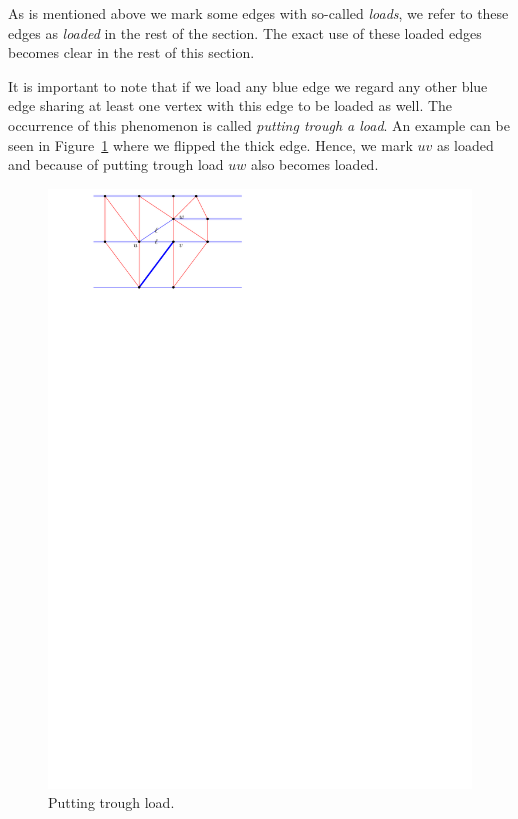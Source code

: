   As is mentioned above we mark some edges with so-called \emph{loads}, we refer to these edges as \emph{loaded} in the rest of the section.
  The exact use of these loaded edges becomes clear in the rest of this section.

  It is important to note that if we load any blue edge we regard any other blue edge sharing at least one vertex with this edge to be loaded as well.
  The occurrence of this phenomenon is called \emph{putting trough a load}.
  An example can be seen in Figure~\ref{fig:subdiv:putTrougLoad} where we flipped the thick edge.
  Hence, we mark $uv$ as loaded and because of putting trough load $uw$ also becomes loaded.

  \begin{figure}[h]
    \centering
    \includegraphics[scale=1]{blueFaceSubdivision/img/puttingTroughLoad.pdf}
    \caption{Putting trough load.}
    \label{fig:subdiv:putTrougLoad}
  \end{figure}


